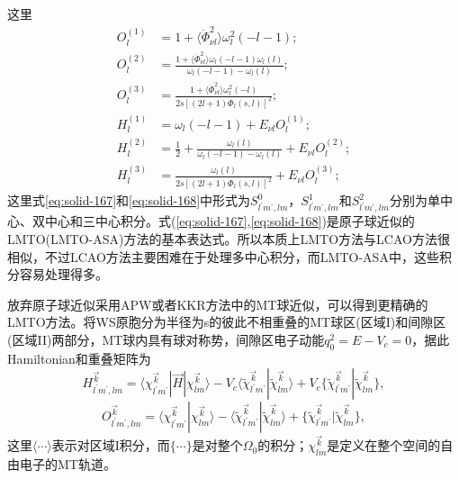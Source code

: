 这里
\begin{equation}
  \begin{split}
    O_l^{(1)}&=1+\langle\dot\Phi_{\nu l}^2\rangle\omega_l^2(-l-1);\\
    O_l^{(2)}&=\frac{1+\langle\dot\Phi_{\nu l}^2\rangle\omega_l(-l-1)\omega_l(l)}{\omega_l(-l-1)-\omega_l(l)};\\
    O_l^{(3)}&=\frac{1+\langle\dot\Phi_{\nu l}^2\rangle\omega_l^2(-l)}{2s[(2l+1)\Phi_l(s,l)]^2};\\
    H_l^{(1)}&=\omega_l(-l-1)+E_{\nu l}O_l^{(1)};\\
    H_l^{(2)}&=\frac12+\frac{\omega_l(l)}{\omega_l(-l-1)-\omega_l(l)}+E_{\nu l}O_l^{(2)};\\
    H_l^{(3)}&=\frac{\omega_l(l)}{2s[(2l+1)\Phi_l(s,l)]^2}+E_{\nu l}O_l^{(3)};
  \end{split}
  \label{eq:solid-169}
\end{equation}
这里式\eqref{eq:solid-167}和\eqref{eq:solid-168}中形式为$S_{l^{\prime}m^{\prime},lm}^0$，$S_{l^{\prime}m^{\prime},lm}^1$和$S_{l^{\prime}m^{\prime},lm}^2$分别为单中心、双中心和三中心积分。式(\ref{eq:solid-167},\ref{eq:solid-168})是原子球近似的LMTO(LMTO-ASA)方法的基本表达式。所以本质上LMTO方法与LCAO方法很相似，不过LCAO方法主要困难在于处理多中心积分，而LMTO-ASA中，这些积分容易处理得多。

放弃原子球近似采用APW或者KKR方法中的MT球近似，可以得到更精确的LMTO方法。将WS原胞分为半径为s的彼此不相重叠的MT球区(区域I)和间隙区(区域II)两部分，MT球内具有球对称势，间隙区电子动能$q_0^2=E-V_c=0$，据此Hamiltonian和重叠矩阵为
\begin{equation}
  H_{l^{\prime}m^{\prime},lm}^{\vec k}=\langle\chi_{l^{\prime}m^{\prime}}^{\vec k}|\vec H|\chi_{lm}^{\vec k}\rangle-V_c\langle\tilde\chi_{l^{\prime}m^{\prime}}^{\vec k}|\tilde\chi_{lm}^{\vec k}\rangle+V_c\{\tilde\chi_{l^{\prime}m^{\prime}}^{\vec k}|\tilde\chi_{lm}^{\vec k}\},
  \label{eq:solid-170}
\end{equation}
\begin{equation}
  O_{l^{\prime}m^{\prime},lm}^{\vec k}=\langle\chi_{l^{\prime}m^{\prime}}^{\vec k}|\chi_{lm}^{\vec k}\rangle-\langle\tilde\chi_{l^{\prime}m^{\prime}}^{\vec k}|\tilde\chi_{lm}^{\vec k}\rangle+\{\tilde\chi_{l^{\prime}m^{\prime}}^{\vec k}|\tilde\chi_{lm}^{\vec k}\},
  \label{eq:solid-171}
\end{equation}
这里$\langle\cdots\rangle$表示对区域I积分，而$\{\cdots\}$是对整个$\Omega_0$的积分；$\chi_{lm}^{\vec k}$是定义在整个空间的自由电子的MT轨道。

